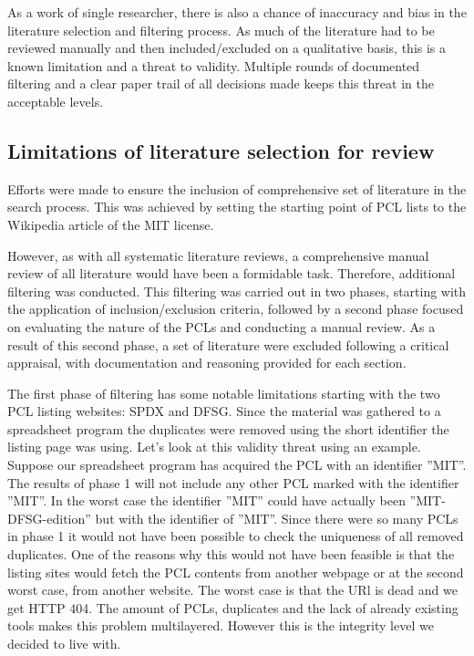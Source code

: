 As a work of single researcher, there is also a chance of inaccuracy and bias in the literature selection and filtering process. As much of the literature had to be reviewed manually and then included/excluded on a qualitative basis, this is a known limitation and a threat to validity. Multiple rounds of documented filtering and a clear paper trail of all decisions made keeps this threat in the acceptable levels.

\subsection{Limitations of literature selection for review}
Efforts were made to ensure the inclusion of comprehensive set of literature in the search process. This was achieved by setting the starting point of PCL lists to the Wikipedia article of the MIT license.

However, as with all systematic literature reviews, a comprehensive manual review of all literature would have been a formidable task. Therefore, additional filtering was conducted. This filtering was carried out in two phases, starting with the application of inclusion/exclusion criteria, followed by a second phase focused on evaluating the nature of the PCLs and conducting a manual review. As a result of this second phase, a set of literature were excluded following a critical appraisal, with documentation and reasoning provided for each section.

The first phase of filtering has some notable limitations starting with the two PCL listing websites: SPDX and DFSG. Since the material was gathered to a spreadsheet program the duplicates were removed using the short identifier the listing page was using. Let's look at this validity threat using an example. Suppose our spreadsheet program has acquired the PCL with an identifier ''MIT''. The results of phase 1 will not include any other PCL marked with the identifier ''MIT''. In the worst case the identifier ''MIT'' could have actually been ''MIT-DFSG-edition'' but with the identifier of ''MIT''. Since there were so many PCLs in phase 1 it would not have been possible to check the uniqueness of all removed duplicates. One of the reasons why this would not have been feasible is that the listing sites would fetch the PCL contents from another webpage or at the second worst case, from another website. The worst case is that the URl is dead and we get HTTP 404. The amount of PCLs, duplicates and the lack of already existing tools makes this problem multilayered. However this is the integrity level we decided to live with.

